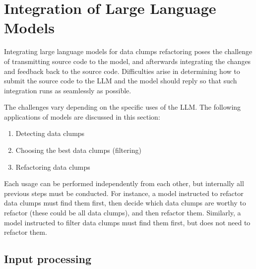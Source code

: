 \section{Integration of Large Language Models}\label{sec:implementation_tools}
Integrating large language models for data clumps refactoring poses the challenge of transmitting source code to the model, and afterwards integrating the changes and  feedback back to the source code. Difficulties arise in determining how to submit the source code to the \ac{LLM} and  the model should reply so that such integration runs as seamlessly as possible. 

The challenges vary depending on the specific uses of the \ac{LLM}. The following applications of models are discussed in this section:
\begin{enumerate}
    \item Detecting data clumps
    \item Choosing the best data clumps (filtering)
    \item Refactoring data clumps
\end{enumerate}

Each usage can be performed independently from each other, but internally all previous steps must be conducted. For instance, a model instructed to refactor data clumps must find them first, then decide which data clumps are worthy to refactor (these could be all data clumps), and then refactor them. Similarly, a model instructed to filter data clumps must find them first, but does not need to refactor them.

\subsection{Input processing}\label{sec:input_format}

